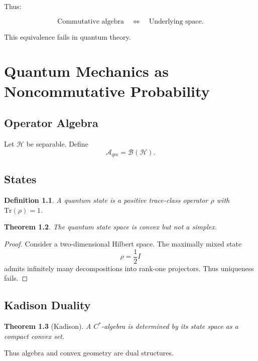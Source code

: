 \documentclass[11pt]{book}
\newtheorem{theorem}{Theorem}[chapter]
\newtheorem{definition}[theorem]{Definition}
\begin{document}
Thus:

\[
\text{Commutative algebra}
\quad \Longleftrightarrow \quad
\text{Underlying space}.
\]

This equivalence fails in quantum theory.

\chapter{Quantum Mechanics as Noncommutative Probability}

\section{Operator Algebra}

Let $\mathcal{H}$ be separable.
Define
\[
\mathcal{A}_{qm} = \mathcal{B}(\mathcal{H}).
\]

\section{States}

\begin{definition}
A quantum state is a positive trace-class operator
$\rho$ with $\mathrm{Tr}(\rho)=1$.
\end{definition}

\begin{theorem}
The quantum state space is convex but not a simplex.
\end{theorem}

\begin{proof}
Consider a two-dimensional Hilbert space.
The maximally mixed state
\[
\rho = \frac12 I
\]
admits infinitely many decompositions
into rank-one projectors.
Thus uniqueness fails.
\end{proof}

\section{Kadison Duality}

\begin{theorem}[Kadison]
A $C^*$-algebra is determined by its state space
as a compact convex set.
\end{theorem}

Thus algebra and convex geometry are dual structures.

\bigskip

\end{document}
